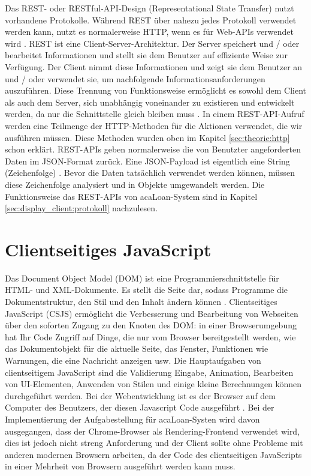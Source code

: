 Das REST- oder RESTful-API-Design (Representational State Transfer) nutzt vorhandene Protokolle. Während REST über nahezu jedes Protokoll verwendet werden kann, nutzt es normalerweise HTTP, wenn es für Web-APIs verwendet wird \cite{website:rest}. REST ist eine Client-Server-Architektur. Der Server speichert und / oder bearbeitet Informationen und stellt sie dem Benutzer auf effiziente Weise zur Verfügung. Der Client nimmt diese Informationen und zeigt sie dem Benutzer an und / oder verwendet sie, um nachfolgende Informationsanforderungen auszuführen. Diese Trennung von Funktionsweise ermöglicht es sowohl dem Client als auch dem Server, sich unabhängig voneinander zu existieren und entwickelt werden, da nur die Schnittstelle gleich bleiben muss  \cite{website:rest2}. In einem REST-API-Aufruf werden eine Teilmenge der HTTP-Methoden für die Aktionen verwendet, die wir ausführen müssen. Diese Methoden wurden oben im Kapitel \ref{sec:theorie:http} schon erklärt. REST-APIs geben normalerweise die von Benutzter angeforderten Daten im JSON-Format zurück. Eine JSON-Payload ist eigentlich eine String (Zeichenfolge) . Bevor die Daten tatsächlich verwendet werden können, müssen diese Zeichenfolge analysiert und in Objekte umgewandelt werden. Die Funktionsweise das REST-APIs von acaLoan-System sind in Kapitel \ref{sec:display_client:protokoll} nachzulesen.

\section{Clientseitiges JavaScript}
\label{sec:theorie:js}
Das Document Object Model (DOM) ist eine Programmierschnittstelle für HTML- und XML-Dokumente. Es stellt die Seite dar, sodass Programme die Dokumentstruktur, den Stil und den Inhalt ändern können \cite{website:dom}. Clientseitiges JavaScript (CSJS) ermöglicht die Verbesserung und Bearbeitung von Webseiten über den soforten Zugang zu den Knoten des DOM: in einer Browserumgebung hat Ihr Code Zugriff auf Dinge, die nur vom Browser bereitgestellt werden, wie das Dokumentobjekt für die aktuelle Seite, das Fenster, Funktionen wie Warnungen, die eine Nachricht anzeigen usw. Die Hauptaufgaben von clientseitigem JavaScript sind die Validierung Eingabe, Animation, Bearbeiten von UI-Elementen, Anwenden von Stilen und einige kleine Berechnungen können durchgeführt werden. Bei der Webentwicklung ist es der Browser auf dem Computer des Benutzers, der diesen Javascript Code ausgeführt \cite{website:csjs}. Bei der Implementierung der Aufgabestellung für acaLoan-Systen wird davon ausgegangen, dass der Chrome-Browser als Rendering-Frontend verwendet wird, dies ist jedoch nicht streng Anforderung und der Client sollte ohne Probleme mit anderen modernen Browsern arbeiten, da der Code des clientseitigen JavaScripts in einer Mehrheit von Browsern ausgeführt werden kann muss. 

